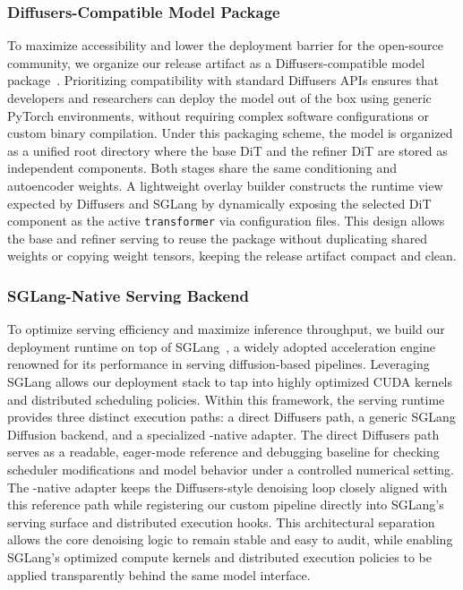 \subsubsection{Diffusers-Compatible Model Package}
To maximize accessibility and lower the deployment barrier for the open-source community, we organize our release artifact as a Diffusers-compatible model package~\cite{von-platen-etal-2022-diffusers}. Prioritizing compatibility with standard Diffusers APIs ensures that developers and researchers can deploy the model out of the box using generic PyTorch environments, without requiring complex software configurations or custom binary compilation.
Under this packaging scheme, the model is organized as a unified root directory where the base DiT and the refiner DiT are stored as independent components.
Both stages share the same conditioning and autoencoder weights.
A lightweight overlay builder constructs the runtime view expected by Diffusers and SGLang by dynamically exposing the selected DiT component as the active \texttt{transformer} via configuration files.
This design allows the base and refiner serving to reuse the package without duplicating shared weights or copying weight tensors, keeping the release artifact compact and clean.

\subsubsection{SGLang-Native Serving Backend}
To optimize serving efficiency and maximize inference throughput, we build our deployment runtime on top of SGLang~\cite{zheng2024sglang}, a widely adopted acceleration engine renowned for its performance in serving diffusion-based pipelines. Leveraging SGLang allows our deployment stack to tap into highly optimized CUDA kernels and distributed scheduling policies.
Within this framework, the serving runtime provides three distinct execution paths: a direct Diffusers path, a generic SGLang Diffusion backend, and a specialized \method-native adapter.
The direct Diffusers path serves as a readable, eager-mode reference and debugging baseline for checking scheduler modifications and model behavior under a controlled numerical setting.
The \method-native adapter keeps the Diffusers-style denoising loop closely aligned with this reference path while registering our custom pipeline directly into SGLang's serving surface and distributed execution hooks.
This architectural separation allows the core denoising logic to remain stable and easy to audit, while enabling SGLang's optimized compute kernels and distributed execution policies to be applied transparently behind the same model interface.

